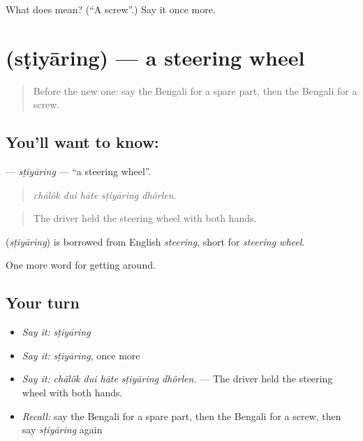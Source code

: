 \begin{tcolorbox}[breakable,colback=teal!4,colframe=teal!35!black,title={Before you move on}]
What does  mean? (\textquotedblleft{}A screw\textquotedblright{}.) Say it once more.
\end{tcolorbox}
\section[\texorpdfstring{\bn{স্টিয়ারিং} (sṭiyāring)}{স্টিয়ারিং (sṭiyāring)}]{ (sṭiyāring) — a steering wheel}

\label{lesson:BN-C394-stiyaring}



\begin{quote}
Before the new one: say the Bengali for a spare part, then the Bengali for a screw.
\end{quote}

\subsection*{You'll want to know: }
\textbf{} — \emph{sṭiyāring} — \textquotedblleft{}a steering wheel\textquotedblright{}.

\begin{quote}
    
\end{quote}

\begin{quote}
\emph{chālôk dui hāte sṭiyāring dhôrlen.}
\end{quote}

\begin{quote}
The driver held the steering wheel with both hands.
\end{quote}

\begin{cousinweb}
\textbf{} (\emph{sṭiyāring}) is borrowed from English \emph{steering}, short for \emph{steering wheel}.
\end{cousinweb}

\begin{grammarlens}[title={What you've built}]
One more word for getting around.
\end{grammarlens}

\subsection*{Your turn}
\begin{itemize}
\raggedright
  \item \emph{Say it:} \emph{sṭiyāring}
  \item \emph{Say it:} \emph{sṭiyāring}, once more
  \item \emph{Say it:} \emph{chālôk dui hāte sṭiyāring dhôrlen.} — The driver held the steering wheel with both hands.
  \item \emph{Recall:} say the Bengali for a spare part, then the Bengali for a screw, then say \emph{sṭiyāring} again
\end{itemize}

